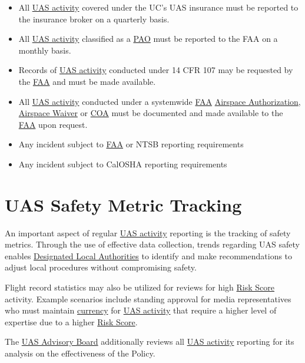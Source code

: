 \documentclass[
]{book}
\providecommand{\tightlist}{%
  \setlength{\itemsep}{0pt}\setlength{\parskip}{0pt}}
\begin{document}
\begin{itemize}
\tightlist
\item
  All \protect\hyperlink{UASactivity}{UAS activity} covered under the UC's UAS insurance must be reported to the insurance broker on a quarterly basis.
\item
  All \protect\hyperlink{UASactivity}{UAS activity} classified as a \protect\hyperlink{PAO}{PAO} must be reported to the FAA on a monthly basis.
\item
  Records of \protect\hyperlink{UASactivity}{UAS activity} conducted under 14 CFR 107 may be requested by the \protect\hyperlink{FAA}{FAA} and must be made available.
\item
  All \protect\hyperlink{UASactivity}{UAS activity} conducted under a systemwide \protect\hyperlink{FAA}{FAA} \protect\hyperlink{AA}{Airspace Authorization}, \protect\hyperlink{AW}{Airspace Waiver} or \protect\hyperlink{COA}{COA} must be documented and made available to the \protect\hyperlink{FAA}{FAA} upon request.
\item
  Any incident subject to \protect\hyperlink{FAA}{FAA} or NTSB reporting requirements
\item
  Any incident subject to CalOSHA reporting requirements
\end{itemize}

\hypertarget{s-safety-metric-tracking}{%
\section{UAS Safety Metric Tracking}\label{s-safety-metric-tracking}}

An important aspect of regular \protect\hyperlink{UASactivity}{UAS activity} reporting is the tracking of safety metrics. Through the use of effective data collection, trends regarding UAS safety enables \protect\hyperlink{DLA}{Designated Local Authorities} to identify and make recommendations to adjust local procedures without compromising safety.

Flight record statistics may also be utilized for reviews for high \protect\hyperlink{riskscore}{Risk Score} activity. Example scenarios include standing approval for media representatives who must maintain \protect\hyperlink{currency}{currency} for \protect\hyperlink{UASactivity}{UAS activity} that require a higher level of expertise due to a higher \protect\hyperlink{riskscore}{Risk Score}.

The \protect\hyperlink{AB}{UAS Advisory Board} additionally reviews all \protect\hyperlink{UASactivity}{UAS activity} reporting for its analysis on the effectiveness of the Policy.
\end{document}
